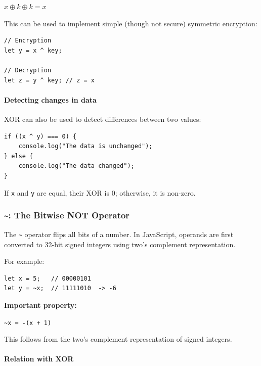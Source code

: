 \documentclass{scrbook}
\begin{document}
\begin{center}
    $x \oplus k \oplus k = x$
\end{center}

This can be used to implement simple (though not secure) symmetric encryption:

\begin{lstlisting}
// Encryption
let y = x ^ key;

// Decryption
let z = y ^ key; // z = x
\end{lstlisting}

\paragraph{Detecting changes in data}

XOR can also be used to detect differences between two values:

\begin{lstlisting}
if ((x ^ y) === 0) {
    console.log("The data is unchanged");
} else {
    console.log("The data changed");
}
\end{lstlisting}

If \texttt{x} and \texttt{y} are equal, their XOR is 0; otherwise, it is non-zero.

\subsubsection{\texttt{\textasciitilde}: The Bitwise NOT Operator}

The \texttt{\textasciitilde} operator flips all bits of a number. In JavaScript, operands are first converted to 32-bit signed integers using two's complement representation.

For example:

\begin{lstlisting}
let x = 5;   // 00000101
let y = ~x;  // 11111010  -> -6
\end{lstlisting}

\textbf{Important property:}
\begin{center}
    \texttt{\textasciitilde x = -(x + 1)}
\end{center}

This follows from the two's complement representation of signed integers.

\paragraph{Relation with XOR}
\end{document}
